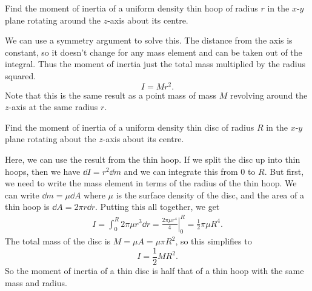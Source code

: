\documentclass[../classical_mechanics.tex]{subfiles}
\begin{document}
            \begin{example}
                Find the moment of inertia of a uniform density thin hoop of radius $r$ in the $x$-$y$ plane rotating around the $z$-axis about its centre.
                        

                We can use a symmetry argument to solve this.
                The distance from the axis is constant, so it doesn't change for any mass element and can be taken out of the integral.
                Thus the moment of inertia just the total mass multiplied by the radius squared.
                \begin{equation}
                    I=Mr^2.
                \end{equation}
                Note that this is the same result as a point mass of mass $M$ revolving around the $z$-axis at the same radius $r$. 
            \end{example}
            \begin{example}
                Find the moment of inertia of a uniform density thin disc of radius $R$ in the $x$-$y$ plane rotating about the $z$-axis about its centre.
                        
                Here, we can use the result from the thin hoop.
                If we split the disc up into thin hoops, then we have $\dd{I}=r^2\dd{m}$ and we can integrate this from $0$ to $R$.
                But first, we need to write the mass element in terms of the radius of the thin hoop.
                We can write $\dd{m}=\mu\dd{A}$ where $\mu$ is the surface density of the disc, and the area of a thin hoop is $\dd{A}=2\pi r\dd{r}$.
                Putting this all together, we get
                \begin{align}
                    I=\int_0^R 2\pi\mu r^3\dd{r}=\left.\frac{2\pi\mu r^4}{4}\right|_0^R=\frac{1}{2}\pi\mu R^4.
                \end{align}
                The total mass of the disc is $M=\mu A=\mu\pi R^2$, so this simplifies to
                \begin{equation}
                    I=\frac{1}{2}MR^2.
                \end{equation}
                So the moment of inertia of a thin disc is half that of a thin hoop with the same mass and radius.
            \end{example}
\end{document}
